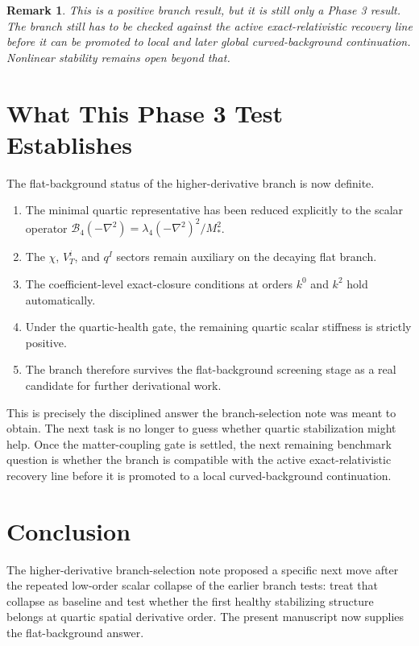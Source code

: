 \documentclass[11pt]{article}
\newtheorem{remark}{Remark}
\begin{document}
\begin{remark}
This is a positive branch result, but it is still only a Phase 3 result. The branch still has to be checked against the active exact-relativistic recovery line before it can be promoted to local and later global curved-background continuation. Nonlinear stability remains open beyond that.
\end{remark}

\section{What This Phase 3 Test Establishes}

The flat-background status of the higher-derivative branch is now definite.
\begin{enumerate}
    \item The minimal quartic representative has been reduced explicitly to the scalar operator \(\mathcal B_4(-\nabla^2)=\lambda_4(-\nabla^2)^2/M_*^2\).
    \item The \(\chi\), \(V_T^i\), and \(q^I\) sectors remain auxiliary on the decaying flat branch.
    \item The coefficient-level exact-closure conditions at orders \(k^0\) and \(k^2\) hold automatically.
    \item Under the quartic-health gate, the remaining quartic scalar stiffness is strictly positive.
    \item The branch therefore survives the flat-background screening stage as a real candidate for further derivational work.
\end{enumerate}

This is precisely the disciplined answer the branch-selection note was meant to obtain. The next task is no longer to guess whether quartic stabilization might help. Once the matter-coupling gate is settled, the next remaining benchmark question is whether the branch is compatible with the active exact-relativistic recovery line before it is promoted to a local curved-background continuation.

\section{Conclusion}

The higher-derivative branch-selection note proposed a specific next move after the repeated low-order scalar collapse of the earlier branch tests: treat that collapse as baseline and test whether the first healthy stabilizing structure belongs at quartic spatial derivative order. The present manuscript now supplies the flat-background answer.
\end{document}
